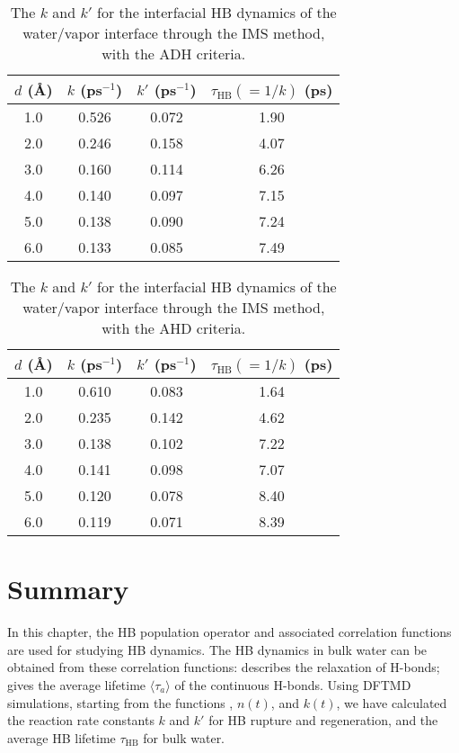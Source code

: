 \begin{table}[H]
\centering
\caption{\label{tab:k_k_prime_tau_128w_pure_ihb_scheme1_ADH} 
    The $k$ and $k'$ for the interfacial HB dynamics of the water/vapor interface through the IMS method, with the ADH criteria.} 
\begin{tabular}{cccc}
 $d$ (\AA) & $k$ (ps$^{-1}$) & $k'$ (ps$^{-1}$) & $\tau_{\text{HB}} (=1/k)$ (ps) \\
\hline
  1.0 & 0.526 & 0.072 & 1.90  \\
  2.0 & 0.246 & 0.158 & 4.07  \\
  3.0 & 0.160 & 0.114 & 6.26  \\
  4.0 & 0.140 & 0.097 & 7.15  \\
  5.0 & 0.138 & 0.090 & 7.24  \\
  6.0 & 0.133 & 0.085 & 7.49  \\
\end{tabular}
\end{table}
\begin{table}[H]
\centering
\caption{\label{tab:k_k_prime_tau_128w_pure_ihb_AHD} 
    The $k$ and $k'$ for the interfacial HB dynamics of the water/vapor interface through the IMS method, with the AHD criteria.} 
\begin{tabular}{cccc}
 $d$ (\AA) & $k$ (ps$^{-1}$) & $k'$ (ps$^{-1}$) & $\tau_{\text{HB}} (=1/k)$ (ps) \\
\hline
  1.0 & 0.610 & 0.083 & 1.64  \\
  2.0 & 0.235 & 0.142 & 4.62  \\
  3.0 & 0.138 & 0.102 & 7.22  \\
  4.0 & 0.141 & 0.098 & 7.07  \\
  5.0 & 0.120 & 0.078 & 8.40  \\
  6.0 & 0.119 & 0.071 & 8.39  \\
\end{tabular}
\end{table}

\newpage
\section{Summary}
In this chapter, the HB population operator and associated correlation functions are used for studying HB dynamics. 
The HB dynamics in bulk water can be obtained from these correlation functions: 
\CHB describes the relaxation of H-bonds; \SHB gives the average lifetime $\langle \tau_a \rangle$ of the continuous H-bonds. 
Using DFTMD simulations, starting from the functions \CHB, $n(t)$, and $k(t)$, 
we have calculated the reaction rate constants $k$ and $k'$ for HB rupture and regeneration, and the average HB lifetime $\tau_{\text{HB}}$ for bulk water.

